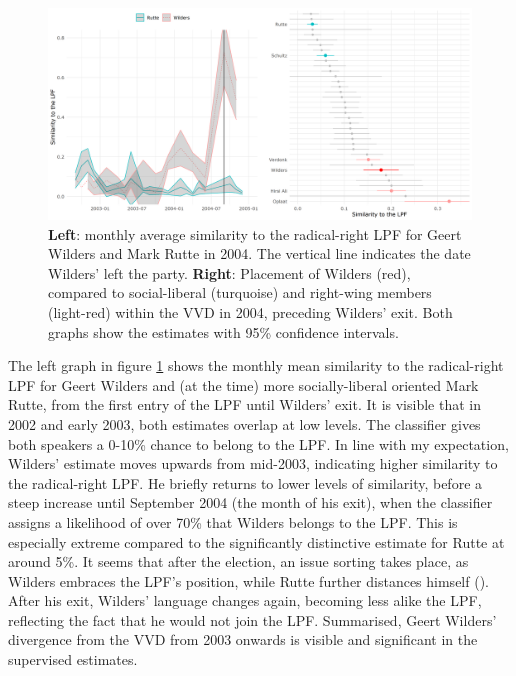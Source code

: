 \documentclass{article}
\begin{document}
\begin{figure}
\includegraphics[width=\linewidth]{NL/vis/Wilders_both.png}
\caption{\textbf{Left}: monthly average similarity to the radical-right LPF for Geert Wilders and Mark Rutte in 2004. The vertical line indicates the date Wilders' left the party. \textbf{Right}: Placement of Wilders (red), compared to social-liberal (turquoise) and right-wing members (light-red) within the VVD in 2004, preceding Wilders' exit. Both graphs show the estimates with 95\% confidence intervals.}
\label{fig:wilders}
\end{figure}

The left graph in figure \ref{fig:wilders} shows the monthly mean similarity to the radical-right LPF for Geert Wilders and (at the time) more socially-liberal oriented Mark Rutte, from the first entry of the LPF until Wilders' exit. It is visible that in 2002 and early 2003, both estimates overlap at low levels. The classifier gives both speakers a 0-10\% chance to belong to the LPF. In line with my expectation, Wilders' estimate moves upwards from mid-2003, indicating higher similarity to the radical-right LPF. He briefly returns to lower levels of similarity, before a steep increase until September 2004 (the month of his exit), when the classifier assigns a likelihood of over 70\% that Wilders belongs to the LPF. This is especially extreme compared to the significantly distinctive estimate for Rutte at around 5\%. It seems that after the election, an issue sorting takes place, as Wilders embraces the LPF's position, while Rutte further distances himself (\cite{Carmines1986}). After his exit, Wilders' language changes again, becoming less alike the LPF, reflecting the fact that he would not join the LPF.  Summarised, Geert Wilders' divergence from the VVD from 2003 onwards is visible and significant in the supervised estimates.\par
\end{document}
